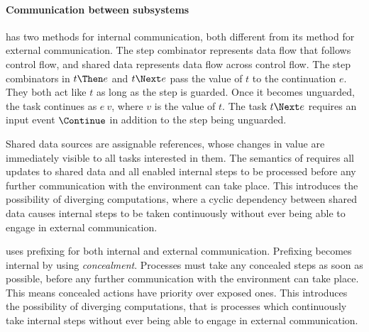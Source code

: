 \paragraph{Communication between subsystems}

\TOPHAT has two methods for internal communication, both different from its method for external communication.
The step combinator represents data flow that follows control flow, and shared data represents data flow across control flow.
%
The step combinators in $t \Then e$ and $t \Next e$ pass the value of $t$ to the continuation $e$.
They both act like $t$ as long as the step is guarded.
Once it becomes unguarded, the task continues as $e\ v$, where $v$ is the value of $t$.
The task $t \Next e$ requires an input event $\Continue$ in addition to the step being unguarded. %

Shared data sources are assignable references, whose changes in value are immediately visible to all tasks interested in them.
The semantics of \TOPHAT requires all updates to shared data and all enabled internal steps to be processed before any further communication with the environment can take place.
This introduces the possibility of diverging computations, where a cyclic dependency between shared data causes internal steps to be taken continuously without ever being able to engage in external communication.

\CSP uses prefixing for both internal and external communication.
Prefixing becomes internal by using \emph{concealment}.
Processes must take any concealed steps as soon as possible, before any further communication with the environment can take place.
This means concealed actions have priority over exposed ones.
This introduces the possibility of diverging computations, that is processes which continuously take internal steps without ever being able to engage in external communication.




